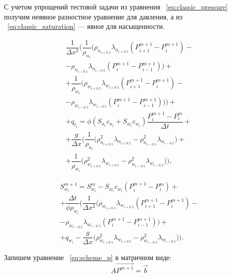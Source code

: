 С учетом упрощений тестовой задачи из уравнения ~\eqref{eq:classic_pressure} получим неявное разностное уравнение для давления,
а из ~\eqref{eq:classic_saturation} --- явное для насыщенности.

\begin{equation} \label{eq:scheme_p}
 \begin{gathered} 
  \dfrac{1}{\Delta x^2} \bigg(\dfrac{1}{\rho_{n_i}} \big( \rho_{n_{i+0.5}} \lambda_{n_{i+0.5}} (P_{i+1}^{m+1} - P_i^{m+1}) -\\
  - \rho_{n_{i-0.5}} \lambda_{n_{i-0.5}} (P_i^{m+1} - P_{i-1}^{m+1})\big) + \\
  + \dfrac{1}{\rho_{w_i}} \big( \rho_{w_{i+0.5}} \lambda_{w_{i+0.5}} (P_{i+1}^{m+1} - P_i^{m+1}) -\\
  - \rho_{w_{i-0.5}} \lambda_{w_{i-0.5}} (P_i^{m+1} - P_{i-1}^{m+1})\big)\bigg) + \\
  + q_{t_i} = \phi(S_{n_i}c_{n_i}+S_{w_i}c_{w_i}) \dfrac{P_i^{m+1} - P_i^m}{\Delta t} +\\
  + \dfrac{g}{\Delta x} \bigg(\dfrac{1}{\rho_{n_i}} \big( \rho_{n_{i+0.5}}^2 \lambda_{n_{i+0.5}} 
  - \rho_{n_{i-0.5}}^2 \lambda_{n_{i-0.5}} \big) + \\
  + \dfrac{1}{\rho_{w_i}} \big( \rho_{w_{i+0.5}}^2 \lambda_{w_{i+0.5}} 
  - \rho_{w_{i-0.5}}^2 \lambda_{w_{i-0.5}} \big)\bigg),
 \end{gathered}
\end{equation} \bigskip

\begin{equation} \label{eq:scheme_s}
 \begin{gathered} 
  S_{w_i}^{m+1} = S_{w_i}^{m} - S_{w_i}c_{w_i} (P_i^{m+1} - P_i^m) + \\
  + \dfrac{\Delta t}{\phi\rho_{w_i}}\Bigg( \dfrac{1}{\Delta x^2} \bigg(\rho_{w_{i+0.5}} \lambda_{w_{i+0.5}} (P_{i+1}^{m+1} - P_i^{m+1}) -\\
  - \rho_{w_{i-0.5}} \lambda_{w_{i-0.5}} (P_i^{m+1} - P_{i-1}^{m+1}) \bigg) +\\
  + q_{w_i} - \dfrac{g}{\Delta x} \bigg(\rho_{w_{i+0.5}}^2 \lambda_{w_{i+0.5}} - \rho_{w_{i-0.5}}^2 \lambda_{w_{i-0.5}} \bigg) \Bigg).
 \end{gathered}
\end{equation}

Запишем уравнение ~\eqref{eq:scheme_p} в матричном виде:
\begin{equation} \label{eq:scheme_p_matrix}
A\overrightarrow{P^{m+1}} = \vec{b}
\end{equation}

